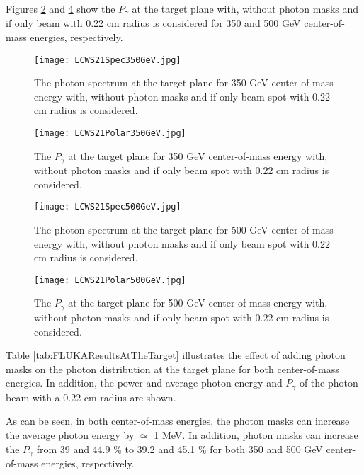 \documentclass[a4paper]{article}
\begin{document}
 Figures \ref{fig:LCWS211D175350} and \ref{fig:LCWS211D175500} show  the $P_\gamma$ at the target plane with, without photon masks and if only beam with 0.22 cm radius is considered for 350 and 500 GeV center-of-mass energies, respectively.



\begin{figure}[h]
\centering
\texttt{[image: LCWS21Spec350GeV.jpg]}
\caption{The photon spectrum at the target plane for 350 GeV center-of-mass energy with, without photon masks and if only beam spot with 0.22 cm radius is considered.}
\label{fig:LCWS212D350}
\end{figure}








\begin{figure}[h]
\centering
\texttt{[image: LCWS21Polar350GeV.jpg]}
\caption{The $P_\gamma$ at the target plane for 350 GeV center-of-mass energy with, without photon masks and if only beam spot with 0.22 cm radius is considered.}
\label{fig:LCWS211D175350}
\end{figure}


\newpage

\begin{figure}[h]
\centering
\texttt{[image: LCWS21Spec500GeV.jpg]}
\caption{The photon spectrum at the target plane for 500 GeV center-of-mass energy with, without photon masks and if only beam spot with 0.22 cm radius is considered.}
\label{fig:LCWS212D500}
\end{figure}

\begin{figure}[h]
\centering
\texttt{[image: LCWS21Polar500GeV.jpg]}
\caption{The $P_\gamma$ at the target plane for 500 GeV center-of-mass energy with, without photon masks and if only beam spot with 0.22 cm radius is considered.}
\label{fig:LCWS211D175500}
\end{figure}




Table \ref{tab:FLUKAResultsAtTheTarget} illustrates the effect of adding photon masks on the photon distribution at the target plane for both center-of-mass energies. In addition, the power and average photon energy and $P_\gamma$ of the photon beam with a 0.22 cm radius are shown.

As can be seen, in both center-of-mass energies, the photon masks can increase the average photon energy by $\simeq$ 1 MeV.  In addition, photon masks can increase the $P_\gamma$ from 39 and 44.9 \% to 39.2 and 45.1 \% for both 350 and 500 GeV center-of-mass energies, respectively. 
\end{document}
